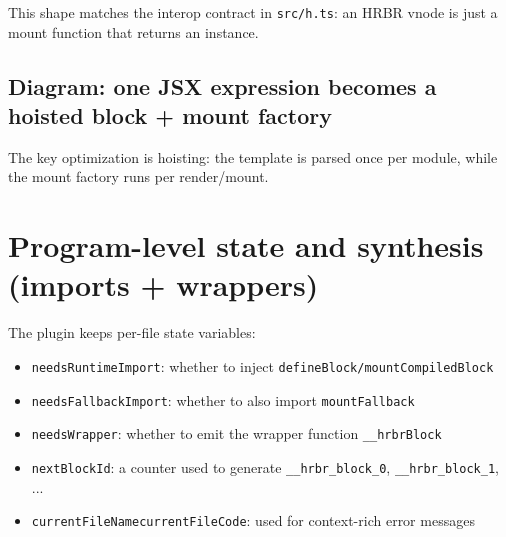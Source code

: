 This shape matches the interop contract in \texttt{src/h.ts}: an HRBR vnode is just a mount function that returns an instance.

\subsection*{Diagram: one JSX expression becomes a hoisted block + mount factory}
\begin{center}
\end{center}

The key optimization is hoisting: the template is parsed once per module, while the mount factory runs per render/mount.

\section{Program-level state and synthesis (imports + wrappers)}

The plugin keeps per-file state variables:

\begin{itemize}
\item \texttt{needsRuntimeImport}: whether to inject \texttt{defineBlock/mountCompiledBlock}
\item \texttt{needsFallbackImport}: whether to also import \texttt{mountFallback}
\item \texttt{needsWrapper}: whether to emit the wrapper function \texttt{\_\_hrbrBlock}
\item \texttt{nextBlockId}: a counter used to generate \texttt{\_\_hrbr\_block\_0}, \texttt{\_\_hrbr\_block\_1}, ...
\item \texttt{currentFileName\/currentFileCode}: used for context-rich error messages
\end{itemize}

